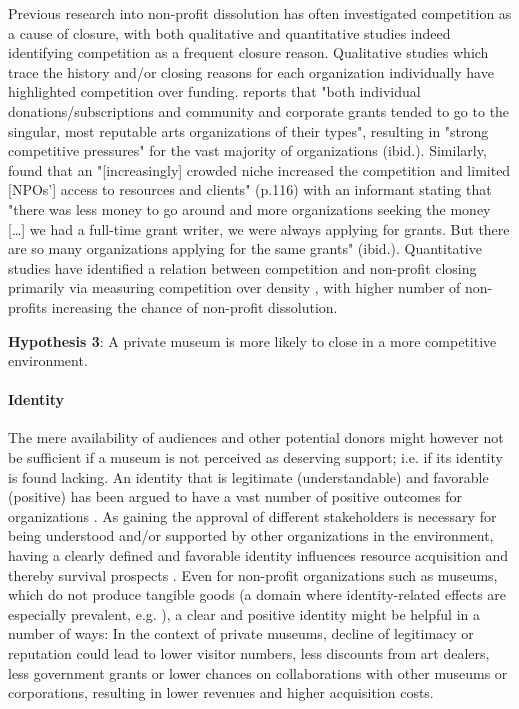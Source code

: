 \documentclass[12pt]{article}
\begin{document}
Previous research into non-profit dissolution has often investigated competition as a cause of closure, with both qualitative and quantitative studies indeed identifying competition as a frequent closure reason.
Qualitative studies which trace the history and/or closing reasons for each organization individually have highlighted competition over funding.
\textcite{Hager_1999_demise} reports that "both individual donations/subscriptions and community and corporate grants tended to go to the singular, most reputable arts organizations of their types", resulting in "strong competitive pressures" for the vast majority of organizations (ibid.).
Similarly, \textcite{HernandezOrtiz_2022_discontinuity} found that an "[increasingly] crowded niche increased the competition and limited [NPOs'] access to resources and clients" (p.116) with an informant stating that "there was less money to go around and more organizations seeking the money [\ldots{}] we had a full-time grant writer, we were always applying for grants. But there are so many organizations applying for the same grants" (ibid.).
Quantitative studies have identified a relation between competition and non-profit closing primarily via measuring competition over density \cite{Park_Shon_Lu_2021_mortality,Haugh_etal_2021_nascent,Lu_Shon_Zhang_2019_dissolution}, with higher number of non-profits increasing the chance of non-profit dissolution.



\textbf{Hypothesis 3}: A private museum is more likely to close in a more competitive environment.
\paragraph*{Identity}

The mere availability of audiences and other potential donors might however not be sufficient if a museum is not perceived as deserving support; i.e. if its identity is found lacking. 
An identity that is legitimate (understandable) and favorable (positive) has been argued to have a vast number of positive outcomes for organizations \parencite{Lange_Lee_Dai_2010_reputation}.
As gaining the approval of different stakeholders is necessary for being understood and/or supported by other organizations in the environment, having a clearly defined and favorable identity influences resource acquisition and thereby survival prospects \parencite{Rao_1994_reputation}.
Even for non-profit organizations such as museums, which do not produce tangible goods (a domain where identity-related effects are especially prevalent, e.g. \cite{Hsu_2015_granted,Bogaert_etal_2014_ecological}), a clear and positive identity might be helpful in a number of ways:
In the context of private museums, decline of legitimacy or reputation could lead to lower visitor numbers, less discounts from art dealers, less government grants or lower chances on collaborations with other museums or corporations, resulting in lower revenues and higher acquisition costs.
\end{document}
